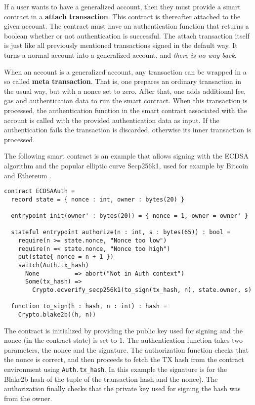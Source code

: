 If a user wants to have a generalized account, then they must
provide a smart contract in a \textbf{attach transaction}. This
contract is thereafter attached to the given account. The contract
must have an authentication function that returns a boolean whether or
not authentication is successful. The attach transaction itself is
just like all previously mentioned transactions signed in the default
way. It turns a normal account into a generalized account, and
\textit{there is no way back}.

When an account is a generalized account, any transaction can
be wrapped in a so called \textbf{meta transaction}. That is, one
prepares an ordinary transaction in the usual way, but with a nonce set to
zero. After that, one adds additional fee, gas and authentication data to
run the smart contract. When this transaction is processed, the
authentication function in the smart contract associated with the
account is called with the provided authentication data as input. If
the authentication fails the transaction is discarded, otherwise its
inner transaction is processed.

The following smart contract is an example that allows signing with
the ECDSA algorithm \cite{johnson2001elliptic} and the popular elliptic curve
Secp256k1, used for example by Bitcoin and Ethereum
\cite{bos2014elliptic, mayer2016ecdsa}.

\begin{verbatim}
contract ECDSAAuth =
  record state = { nonce : int, owner : bytes(20) }

  entrypoint init(owner' : bytes(20)) = { nonce = 1, owner = owner' }

  stateful entrypoint authorize(n : int, s : bytes(65)) : bool =
    require(n >= state.nonce, "Nonce too low")
    require(n =< state.nonce, "Nonce too high")
    put(state{ nonce = n + 1 })
    switch(Auth.tx_hash)
      None          => abort("Not in Auth context")
      Some(tx_hash) =>
        Crypto.ecverify_secp256k1(to_sign(tx_hash, n), state.owner, s)

  function to_sign(h : hash, n : int) : hash =
    Crypto.blake2b((h, n))

\end{verbatim}

The contract is initialized by providing the public key used for
signing and the nonce (in the contract state) is set to 1. The
authentication function takes two parameters, the nonce and the signature.
The authorization function checks that the nonce is correct, and then
proceeds to fetch the TX hash from the contract environment using
\verb+Auth.tx_hash+. In this example the signature is for the Blake2b
hash of the tuple of the transaction hash and the nonce). The
authorization finally checks that the private key used for signing the
hash was from the owner.


